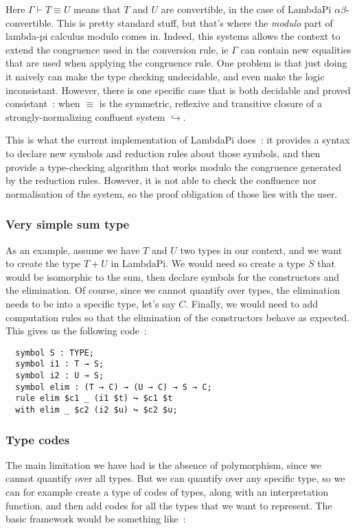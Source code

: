 Here $\Gamma\vdash T \equiv U$ means that $T$ and $U$ are convertible, in the case of LambdaPi
$\alpha\beta$-convertible. This is pretty standard stuff, but that's where the
\emph{modulo} part of lambda-pi calculus modulo comes in. Indeed, this systems
allows the context to extend the congruence used in the conversion rule, ie $\Gamma$
can contain new equalities that are used when applying the congruence rule. One
problem is that just doing it naively can make the type checking undecidable,
and even make the logic inconsistant. However, there is one specific case that
is both decidable and proved consistant~: when $\equiv$ is the symmetric, reflexive
and transitive closure of a strongly-normalizing confluent system $\hookrightarrow$.

This is what the current implementation of LambdaPi does~: it provides a syntax
to declare new symbols and reduction rules about those symbols, and then provide
a type-checking algorithm that works modulo the congruence generated by the
reduction rules. However, it is not able to check the confluence nor
normalisation of the system, so the proof obligation of those lies with the user.

\subsubsection{Very simple sum type}

As an example, assume we have $T$ and $U$ two types in our context, and we want
to create the type $T + U$ in LambdaPi. We would need so create a type $S$ that
would be isomorphic to the sum, then declare symbols for the constructors and
the elimination. Of course, since we cannot quantify over types, the elimination
needs to be into a specific type, let's say $C$.  Finally, we would need to add
computation rules so that the elimination of the constructors behave as
expected. This gives us the following code~:

\begin{lstlisting}
  symbol S : TYPE;
  symbol i1 : T → S;
  symbol i2 : U → S;
  symbol elim : (T → C) → (U → C) → S → C;
  rule elim $c1 _ (i1 $t) ↪ $c1 $t
  with elim _ $c2 (i2 $u) ↪ $c2 $u;
\end{lstlisting}

\subsubsection{Type codes}\label{codes}

The main limitation we have had is the absence of polymorphism, since we cannot
quantify over all types. But we can quantify over any specific type, so we can
for example create a type of codes of types, along with an interpretation
function, and then add codes for all the types that we want to represent. The
basic framework would be something like~:


